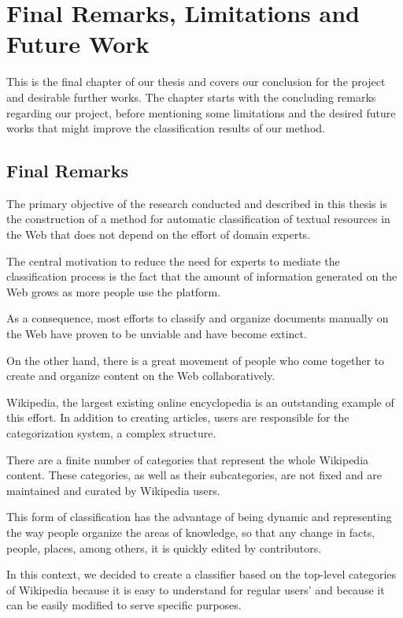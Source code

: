 \chapter{\hspace*{3pt} Final Remarks, Limitations and Future Work}
\label{chapter:conclusion}

This is the final chapter of our thesis and covers our conclusion for the project and desirable further works. The chapter starts with the concluding remarks regarding our project, before mentioning some limitations and the desired future works that might improve the classification results of our method.

\section{\hspace*{3pt}  Final Remarks}
The primary objective of the research conducted and described in this thesis is the construction of a method for automatic classification of textual resources in the Web that does not depend on the effort of domain experts.

The central motivation to reduce the need for experts to mediate the classification process is the fact that the amount of information generated on the Web grows as more people use the platform.

As a consequence, most efforts to classify and organize documents manually on the Web have proven to be unviable and have become extinct.

On the other hand, there is a great movement of people who come together to create and organize content on the Web collaboratively.

Wikipedia, the largest existing online encyclopedia is an outstanding example of this effort. In addition to creating articles, users are responsible for the categorization system, a complex structure. 

There are a finite number of categories that represent the whole Wikipedia content. These categories, as well as their subcategories, are not fixed and are maintained and curated by Wikipedia users. 

This form of classification has the advantage of being dynamic and representing the way people organize the areas of knowledge, so that any change in facts, people, places, among others, it is quickly edited by contributors.

In this context, we decided to create a classifier based on the top-level categories of Wikipedia because it is easy to understand for regular users' and because it can be easily modified to serve specific purposes.

